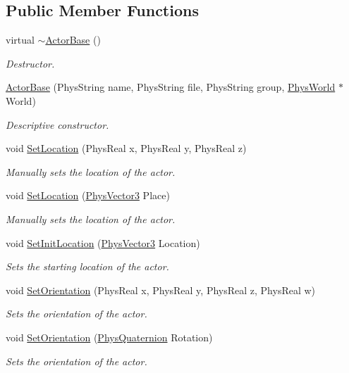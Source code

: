 \subsection*{Public Member Functions}
\begin{DoxyCompactItemize}
\item 
virtual \hyperlink{classActorBase_a6fd984c46b3232c2522adb44be4dedb7}{$\sim$ActorBase} ()
\begin{DoxyCompactList}\small\item\em Destructor. \item\end{DoxyCompactList}\item 
\hyperlink{classActorBase_a673d963aa7a99475cb03250c010dfa15}{ActorBase} (PhysString name, PhysString file, PhysString group, \hyperlink{classPhysWorld}{PhysWorld} $\ast$World)
\begin{DoxyCompactList}\small\item\em Descriptive constructor. \item\end{DoxyCompactList}\item 
void \hyperlink{classActorBase_a34848d620c5d9d2796999edbdcb77c9a}{SetLocation} (PhysReal x, PhysReal y, PhysReal z)
\begin{DoxyCompactList}\small\item\em Manually sets the location of the actor. \item\end{DoxyCompactList}\item 
void \hyperlink{classActorBase_a2a204add0b036de441ebd59d14939000}{SetLocation} (\hyperlink{classPhysVector3}{PhysVector3} Place)
\begin{DoxyCompactList}\small\item\em Manually sets the location of the actor. \item\end{DoxyCompactList}\item 
void \hyperlink{classActorBase_ac118fc21f89d067d987d511b444f7d55}{SetInitLocation} (\hyperlink{classPhysVector3}{PhysVector3} Location)
\begin{DoxyCompactList}\small\item\em Sets the starting location of the actor. \item\end{DoxyCompactList}\item 
void \hyperlink{classActorBase_a9777506815a9840552b30c65d5d70f8d}{SetOrientation} (PhysReal x, PhysReal y, PhysReal z, PhysReal w)
\begin{DoxyCompactList}\small\item\em Sets the orientation of the actor. \item\end{DoxyCompactList}\item 
void \hyperlink{classActorBase_a5fe558ca0a88061615cda52a4dc5bf66}{SetOrientation} (\hyperlink{classPhysQuaternion}{PhysQuaternion} Rotation)
\begin{DoxyCompactList}\small\item\em Sets the orientation of the actor. \item\end{DoxyCompactList}\end{DoxyCompactItemize}
